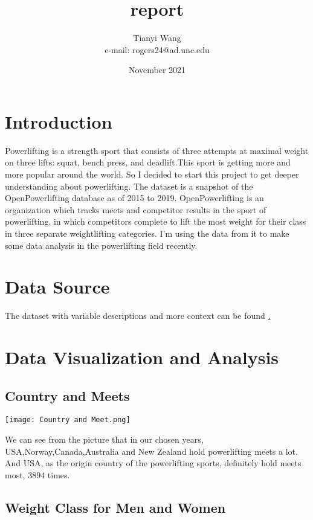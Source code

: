 \documentclass{article}
\title{report}
\author{Tianyi Wang \\ e-mail: rogers24@ad.unc.edu}
\date{November 2021}
\begin{document}
\maketitle

\section{Introduction}

Powerlifting is a strength sport that consists of three attempts at maximal weight on three lifts: squat, bench press, and deadlift.This sport is getting more and more popular around the world. So I decided to start this project to get deeper understanding about powerlifting. The dataset is a snapshot of the OpenPowerlifting database as of 2015 to 2019. OpenPowerlifting is an organization which tracks meets and competitor results in the sport of powerlifting, in which competitors complete to lift the most weight for their class in three separate weightlifting categories. I'm using the data from it to make some data analysis in the powerlifting field recently.

\section{Data Source}

The dataset with variable descriptions and more context can be found \href{https://www.kaggle.com/open-powerlifting/powerlifting-database}.

\section{Data Visualization and Analysis}

\subsection{Country and Meets}

\texttt{[image: Country and Meet.png]}

We can see from the picture that in our chosen years, USA,Norway,Canada,Australia and New Zealand hold powerlifting meets a lot. And USA, as the origin country of the powerlifting sports, definitely hold meets most, 3894 times. 


\subsection{Weight Class for Men and Women}
\end{document}
